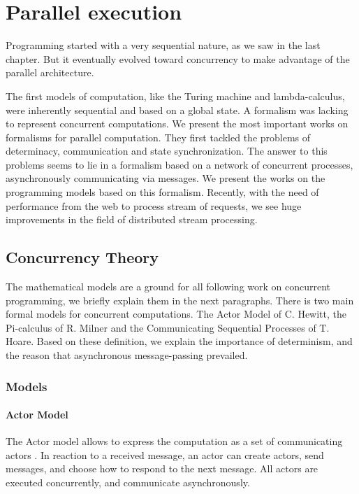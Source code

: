 \section{Parallel execution} \label{chapter3:parallel-execution}

Programming started with a very sequential nature, as we saw in the last chapter.
But it eventually evolved toward concurrency to make advantage of the parallel architecture.

The first models of computation, like the Turing machine and lambda-calculus, were inherently sequential and based on a global state.
A formalism was lacking to represent concurrent computations.
We present the most important works on formalisms for parallel computation.
They first tackled the problems of determinacy, communication and state synchronization.
The answer to this problems seems to lie in a formalism based on a network of concurrent processes, asynchronously communicating via messages.
We present the works on the programming models based on this formalism.
Recently, with the need of performance from the web to process stream of requests, we see huge improvements in the field of distributed stream processing.

\subsection{Concurrency Theory} \label{chapter3:parallel-execution:concurrency-theory}

The mathematical models are a ground for all following work on concurrent programming, we briefly explain them in the next paragraphs.
There is two main formal models for concurrent computations.
The Actor Model of C. Hewitt, the Pi-calculus of R. Milner and the Communicating Sequential Processes of T. Hoare.
Based on these definition, we explain the importance of determinism, and the reason that asynchronous message-passing prevailed.


\subsubsection{Models}

\paragraph{Actor Model}

The Actor model allows to express the computation as a set of communicating actors \cite{Hewitt1973a, Hewitt1977, Clinger1981}.
In reaction to a received message, an actor can create actors, send messages, and choose how to respond to the next message.
All actors are executed concurrently, and communicate asynchronously.

